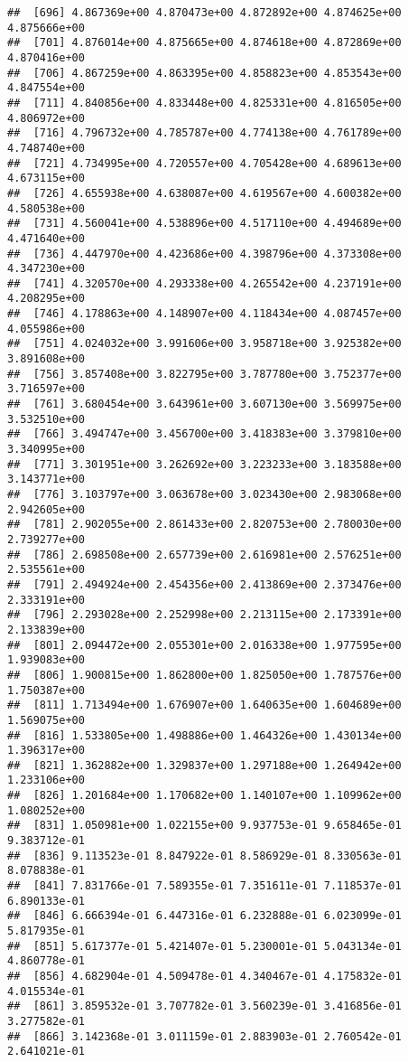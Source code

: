 \documentclass[
]{article}
\begin{document}
\begin{verbatim}
##  [696] 4.867369e+00 4.870473e+00 4.872892e+00 4.874625e+00 4.875666e+00
##  [701] 4.876014e+00 4.875665e+00 4.874618e+00 4.872869e+00 4.870416e+00
##  [706] 4.867259e+00 4.863395e+00 4.858823e+00 4.853543e+00 4.847554e+00
##  [711] 4.840856e+00 4.833448e+00 4.825331e+00 4.816505e+00 4.806972e+00
##  [716] 4.796732e+00 4.785787e+00 4.774138e+00 4.761789e+00 4.748740e+00
##  [721] 4.734995e+00 4.720557e+00 4.705428e+00 4.689613e+00 4.673115e+00
##  [726] 4.655938e+00 4.638087e+00 4.619567e+00 4.600382e+00 4.580538e+00
##  [731] 4.560041e+00 4.538896e+00 4.517110e+00 4.494689e+00 4.471640e+00
##  [736] 4.447970e+00 4.423686e+00 4.398796e+00 4.373308e+00 4.347230e+00
##  [741] 4.320570e+00 4.293338e+00 4.265542e+00 4.237191e+00 4.208295e+00
##  [746] 4.178863e+00 4.148907e+00 4.118434e+00 4.087457e+00 4.055986e+00
##  [751] 4.024032e+00 3.991606e+00 3.958718e+00 3.925382e+00 3.891608e+00
##  [756] 3.857408e+00 3.822795e+00 3.787780e+00 3.752377e+00 3.716597e+00
##  [761] 3.680454e+00 3.643961e+00 3.607130e+00 3.569975e+00 3.532510e+00
##  [766] 3.494747e+00 3.456700e+00 3.418383e+00 3.379810e+00 3.340995e+00
##  [771] 3.301951e+00 3.262692e+00 3.223233e+00 3.183588e+00 3.143771e+00
##  [776] 3.103797e+00 3.063678e+00 3.023430e+00 2.983068e+00 2.942605e+00
##  [781] 2.902055e+00 2.861433e+00 2.820753e+00 2.780030e+00 2.739277e+00
##  [786] 2.698508e+00 2.657739e+00 2.616981e+00 2.576251e+00 2.535561e+00
##  [791] 2.494924e+00 2.454356e+00 2.413869e+00 2.373476e+00 2.333191e+00
##  [796] 2.293028e+00 2.252998e+00 2.213115e+00 2.173391e+00 2.133839e+00
##  [801] 2.094472e+00 2.055301e+00 2.016338e+00 1.977595e+00 1.939083e+00
##  [806] 1.900815e+00 1.862800e+00 1.825050e+00 1.787576e+00 1.750387e+00
##  [811] 1.713494e+00 1.676907e+00 1.640635e+00 1.604689e+00 1.569075e+00
##  [816] 1.533805e+00 1.498886e+00 1.464326e+00 1.430134e+00 1.396317e+00
##  [821] 1.362882e+00 1.329837e+00 1.297188e+00 1.264942e+00 1.233106e+00
##  [826] 1.201684e+00 1.170682e+00 1.140107e+00 1.109962e+00 1.080252e+00
##  [831] 1.050981e+00 1.022155e+00 9.937753e-01 9.658465e-01 9.383712e-01
##  [836] 9.113523e-01 8.847922e-01 8.586929e-01 8.330563e-01 8.078838e-01
##  [841] 7.831766e-01 7.589355e-01 7.351611e-01 7.118537e-01 6.890133e-01
##  [846] 6.666394e-01 6.447316e-01 6.232888e-01 6.023099e-01 5.817935e-01
##  [851] 5.617377e-01 5.421407e-01 5.230001e-01 5.043134e-01 4.860778e-01
##  [856] 4.682904e-01 4.509478e-01 4.340467e-01 4.175832e-01 4.015534e-01
##  [861] 3.859532e-01 3.707782e-01 3.560239e-01 3.416856e-01 3.277582e-01
##  [866] 3.142368e-01 3.011159e-01 2.883903e-01 2.760542e-01 2.641021e-01

\end{verbatim}
\end{document}
